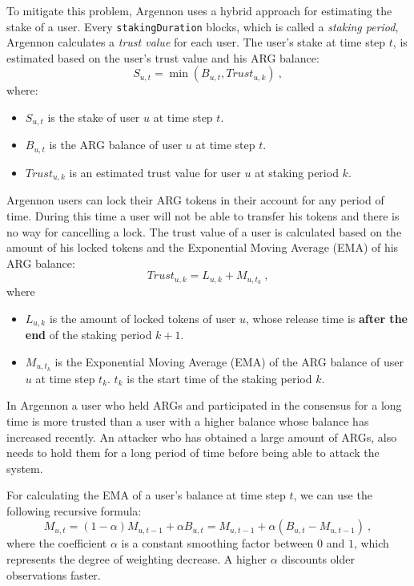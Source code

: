 To mitigate this problem, Argennon uses a hybrid approach for estimating the stake of a user.
Every \texttt{stakingDuration} blocks, which is called a \emph{staking period}, Argennon calculates
a \emph{trust value} for each user. The user's stake
at time step \(t\), is estimated based on the user's trust value and his ARG balance:
\begin{equation}
    S_{u,t} = \min (B_{u,t}, Trust_{u,k})\ ,\label{eq:stake}
\end{equation}
where:
\begin{itemize}
    \item \(S_{u,t}\) is the stake of user \(u\) at time step \(t\).
    \item \(B_{u,t}\) is the ARG balance of user \(u\) at time step \(t\).
    \item \(Trust_{u,k}\) is an estimated trust value for user \(u\) at staking period \(k\).
\end{itemize}

Argennon users can lock their ARG tokens in their account for any period of time. During this time a user
will not be able to transfer his tokens and there is no way for cancelling a lock.
The trust value of a user is calculated based on the amount of his locked tokens and the
Exponential Moving Average (EMA) of his ARG balance:
\begin{equation}
    Trust_{u,k} = L_{u,k} + M_{u,t_k}\ ,\label{eq:trust}
\end{equation}
where
\begin{itemize}
    \item $L_{u,k}$ is the amount of locked tokens of user $u$, whose release time is \textbf{after the end} of
    the staking period $k+1$.
    \item $M_{u,t_k}$ is the Exponential Moving Average (EMA) of the ARG balance of user \(u\) at time step \(t_k\).
    $t_k$ is the start time of the staking period $k$.
\end{itemize}

In Argennon a user who held ARGs and participated in the consensus for a long time is more trusted
than a user with a higher balance whose balance has increased recently. An attacker who has obtained a large
amount of ARGs, also needs to hold them for a long period of time before being able to attack the system.

For calculating the EMA of a user's balance at time step \(t\), we can use the following
recursive formula:
\[
    M_{u,t} = (1 - \alpha) M_{u,t-1} + \alpha B_{u,t} = M_{u,t-1} + \alpha (B_{u,t} - M_{u,t-1})\ ,
\]
where the coefficient \(\alpha\) is a constant smoothing factor between \(0\) and \(1\), which represents the
degree of weighting decrease. A higher \(\alpha\) discounts older observations faster.

